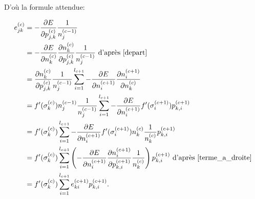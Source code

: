 \documentclass[12pt]{article}
\newcommand{\lc}[1]{l_{#1}}
\newcommand{\neurone}[2]{n_{ #1 }^{ (#2) }}
\newcommand{\poids}[3]{p_{#1,#2}^{ (#3) }}
\newcommand{\nps}[2]{\sigma_{ #1 }^{ (#2) }} %
\newcommand{\err}[3]{e_{ #1 #2 }^{ (#3) }}
\newcommand{\er}[2]{e_{ #1}^{ (#2) }} %
\begin{document}
		D'où la formule attendue:
		
		\begin{align*}
			\err{j}{k}{c} &= - \frac{ \partial E }{ \partial \poids{j}{k}{c} } \frac{1}{ \neurone{j}{c-1} } \\
 			&= - \frac{ \partial E }{ \partial \neurone{k}{c} } \frac{ \partial \neurone{k}{c} }{ \partial \poids{j}{k}{c} } \frac{1}{ \neurone{j}{c-1} } \text{ d'après \ref{depart}} \\
 			&= \frac{ \partial \neurone{k}{c} }{ \partial \poids{j}{k}{c} } \frac{1}{ \neurone{j}{c-1} }
 			\sum_{i=1}^{\lc{c+1}} - \frac{ \partial E }{ \partial \neurone{i}{c+1} } \frac{ \partial \neurone{i}{c+1} }{ \partial \neurone{k}{c} } \\
 			&= f'(\nps{k}{c}) \neurone{j}{c-1} \frac{1}{ \neurone{j}{c-1} }
 			\sum_{i=1}^{\lc{c+1}} - \frac{ \partial E }{ \partial \neurone{i}{c+1} } f'( \nps{i}{c+1} ) \poids{k}{i}{c+1} \\
 			&= f'(\nps{k}{c})
 			\sum_{i=1}^{\lc{c+1}} - \frac{ \partial E }{ \partial \neurone{i}{c+1} } f'( \nps{i}{c+1} ) \neurone{k}{c} \frac{1}{\neurone{k}{c}} \poids{k}{i}{c+1} \\
 			&= f'(\nps{k}{c})
 			\sum_{i=1}^{\lc{c+1}} \left( - \frac{ \partial E }{ \partial \neurone{i}{c+1} } \frac{\partial \neurone{i}{c+1}}{\partial \poids{k}{i}{c+1}} \frac{1}{\neurone{k}{c}} \right) \poids{k}{i}{c+1} \text{ d'après \ref{terme_a_droite}} \\
 			&= f'(\nps{k}{c})
 			\sum_{i=1}^{\lc{c+1}} \err{k}{i}{c+1} \poids{k}{i}{c+1}.
		\end{align*}
		
	
		
	
\end{document}

